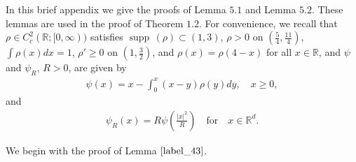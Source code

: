 \documentclass[reqno]{amsart}
\numberwithin{equation}{section}
\theoremstyle{remark}
\DeclareMathOperator{\supp}{supp\,}
\begin{document}
In this brief appendix we give the proofs of Lemma $5.1$ and Lemma $5.2$.  These lemmas are used in the proof of Theorem $1.2$.  For convenience, we recall that $\rho\in C_c^2(\mathbb{R};[0,\infty))$ satisfies $\supp(\rho)\subset (1,3)$, $\rho>0$ on $(\frac{5}{4},\frac{11}{4})$, $\int \rho(x)dx=1$, $\rho'\geq 0$ on $(1,\frac{3}{2})$, and $\rho(x)=\rho(4-x)$ for all $x\in\mathbb{R}$, and $\psi$ and $\psi_R$, $R>0$, are given by
\begin{align*}
\psi(x)=x-\int_0^x (x-y)\rho(y)dy,\quad x\geq 0,
\end{align*}
and
\begin{align*}
\psi_R(x)=R\psi(\frac{|x|^2}{R})\quad\textrm{for}\quad x\in\mathbb{R}^d.
\end{align*}

We begin with the proof of Lemma $\ref{label_43}$.
\end{document}
